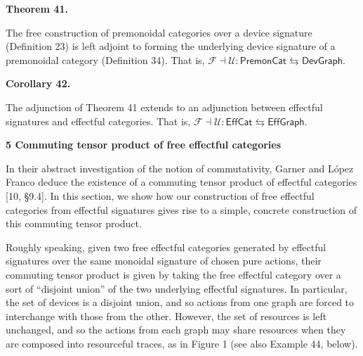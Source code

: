 \par\medskip\noindent\textbf{Theorem 41.}\par
 
 
The free construction of premonoidal categories over a device signature (Definition 23) is left adjoint to forming the underlying device signature of a premonoidal category (Definition 34). That is, $\mathcal{F}\dashv\mathcal{U}:\mathsf{PremonCat}\leftrightarrows\mathsf{DevGraph}.$\par
 
 
 
 
\par\medskip\noindent\textbf{Corollary 42.}\par
 
 
The adjunction of Theorem 41 extends to an adjunction between effectful signatures and effectful categories. That is, $\mathscr{F}\dashv\mathscr{U}:\mathsf{EffCat}\leftrightarrows\mathsf{EffGraph}.$\par
 
 
 
 


 
\par\medskip\noindent\textbf{5 Commuting tensor product of free effectful categories}\par
 
 
In their abstract investigation of the notion of commutativity, Garner and López Franco deduce the existence of a commuting tensor product of effectful categories [10, §9.4]. In this section, we show how our construction of free effectful categories from effectful signatures gives rise to a simple, concrete construction of this commuting tensor product.\par
 
 
 
Roughly speaking, given two free effectful categories generated by effectful signatures over the same monoidal signature of chosen pure actions, their commuting tensor product is given by taking the free effectful category over a sort of “disjoint union” of the two underlying effectful signatures. In particular, the set of devices is a disjoint union, and so actions from one graph are forced to interchange with those from the other. However, the set of resources is left unchanged, and so the actions from each graph may share resources when they are composed into resourceful traces, as in Figure 1 (see also Example 44, below).\par
 
